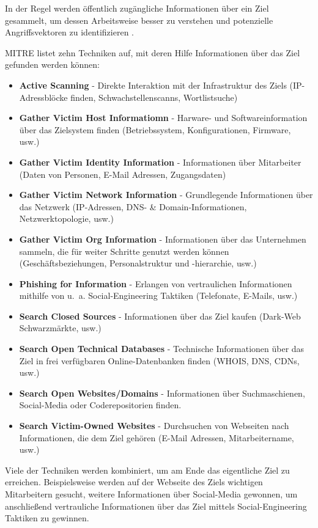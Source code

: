 \documentclass[conference]{IEEEtran}
\begin{document}
In der Regel werden öffentlich zugängliche Informationen über ein Ziel gesammelt, um dessen Arbeitsweise besser zu verstehen und potenzielle Angriffsvektoren zu identifizieren \cite{Cole2013}.

MITRE \cite{MITREReconnaissance} listet zehn Techniken auf, mit deren Hilfe Informationen über das Ziel gefunden werden können:
\begin{itemize}
    \item \textbf{Active Scanning} - Direkte Interaktion mit der Infrastruktur des Ziels (IP-Adressblöcke finden, Schwachstellenscanns, Wortlistsuche)
    \item \textbf{Gather Victim Host Informatiomn} - Harware- und Softwareinformation über das Zielsystem finden (Betriebssystem, Konfigurationen, Firmware, usw.)
    \item \textbf{Gather Victim Identity Information} - Informationen über Mitarbeiter (Daten von Personen, E-Mail Adressen, Zugangsdaten)
    \item \textbf{Gather Victim Network Information} - Grundlegende Informationen über das Netzwerk (IP-Adressen, DNS- \& Domain-Informationen, Netzwerktopologie, usw.)
    \item \textbf{Gather Victim Org Information} - Informationen über das Unternehmen sammeln, die für weiter Schritte genutzt werden können (Geschäftsbeziehungen, Personalstruktur und -hierarchie, usw.)
    \item \textbf{Phishing for Information} - Erlangen von vertraulichen Informationen mithilfe von u.~a. Social-Engineering Taktiken (Telefonate, E-Mails, usw.)
    \item \textbf{Search Closed Sources} - Informationen über das Ziel kaufen (Dark-Web Schwarzmärkte, usw.)
    \item \textbf{Search Open Technical Databases} - Technische Informationen über das Ziel in frei verfügbaren Online-Datenbanken finden (WHOIS, DNS, CDNs, usw.)
    \item \textbf{Search Open Websites/Domains} - Informationen über Suchmaschienen, Social-Media oder Coderepositorien finden.
    \item \textbf{Search Victim-Owned Websites} - Durchsuchen von Webseiten nach Informationen, die dem Ziel gehören (E-Mail Adressen, Mitarbeitername, usw.)
\end{itemize}
Viele der Techniken werden kombiniert, um am Ende das eigentliche Ziel zu erreichen.
Beispielsweise werden auf der Webseite des Ziels wichtigen Mitarbeitern gesucht, weitere Informationen über Social-Media gewonnen, um anschließend vertrauliche Informationen über das Ziel mittels Social-Engineering Taktiken zu gewinnen.
\end{document}
